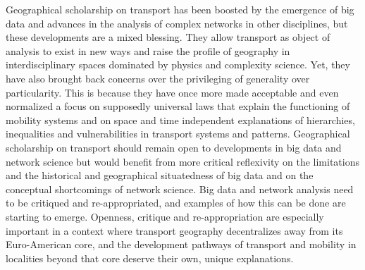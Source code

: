Geographical scholarship on transport has been boosted by the emergence of big data and advances in the analysis of complex networks in other disciplines, but these developments are a mixed blessing. They allow transport as object of analysis to exist in new ways and raise the profile of geography in interdisciplinary spaces dominated by physics and complexity science. Yet, they have also brought back concerns over the privileging of generality over particularity. This is because they have once more made acceptable and even normalized a focus on supposedly universal laws that explain the functioning of mobility systems and on space and time independent explanations of hierarchies, inequalities and vulnerabilities in transport systems and patterns. Geographical scholarship on transport should remain open to developments in big data and network science but would benefit from more critical reflexivity on the limitations and the historical and geographical situatedness of big data and on the conceptual shortcomings of network science. Big data and network analysis need to be critiqued and re-appropriated, and examples of how this can be done are starting to emerge. Openness, critique and re-appropriation are especially important in a context where transport geography decentralizes away from its Euro-American core, and the development pathways of transport and mobility in localities beyond that core deserve their own, unique explanations.